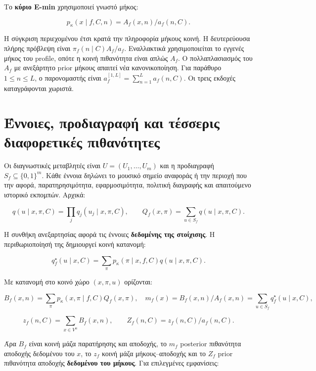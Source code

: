\documentclass[
  10pt,
  a4paper,
]{report}
\begin{document}
Το \textbf{κύριο E-min} χρησιμοποιεί γνωστό μήκος:

\[
p_\kappa(x\mid f,C,n)=A_f(x,n)/a_f(n,C).
\]

Η σύγκριση περιεχομένου έτσι κρατά την πληροφορία μήκους κοινή. Η
δευτερεύουσα πλήρης πρόβλεψη είναι \(\pi_f(n\mid C)A_f/a_f\).
Εναλλακτικά χρησιμοποιείται το εγγενές μήκος του profile, οπότε η κοινή
πιθανότητα είναι απλώς \(A_f\). Ο πολλαπλασιασμός του \(A_f\) με
ανεξάρτητο prior μήκους απαιτεί νέα κανονικοποίηση. Για παράθυρο
\(1\le n\le L\), ο παρονομαστής είναι
\(a_f^{[1,L]}=\sum_{n=1}^L a_f(n,C)\). Οι τρεις εκδοχές καταγράφονται
χωριστά.

\section{Έννοιες, προδιαγραφή και τέσσερις διαφορετικές
πιθανότητες}\label{ux3adux3bdux3bdux3bfux3b9ux3b5ux3c2-ux3c0ux3c1ux3bfux3b4ux3b9ux3b1ux3b3ux3c1ux3b1ux3c6ux3ae-ux3baux3b1ux3b9-ux3c4ux3adux3c3ux3c3ux3b5ux3c1ux3b9ux3c2-ux3b4ux3b9ux3b1ux3c6ux3bfux3c1ux3b5ux3c4ux3b9ux3baux3adux3c2-ux3c0ux3b9ux3b8ux3b1ux3bdux3ccux3c4ux3b7ux3c4ux3b5ux3c2}

Οι διαγνωστικές μεταβλητές είναι \(U=(U_1,\ldots,U_m)\) και η
προδιαγραφή \(S_f\subseteq\{0,1\}^m\). Κάθε έννοια δηλώνει το μουσικό
σημείο αναφοράς ή την περιοχή που την αφορά, παρατηρησιμότητα,
εφαρμοσιμότητα, πολιτική διαγραφής και απαιτούμενο ιστορικό εκπομπών.
Αρχικά:

\[
q(u\mid x,\pi,C)=\prod_jq_j(u_j\mid x,\pi,C),\qquad
Q_f(x,\pi)=\sum_{u\in S_f}q(u\mid x,\pi,C).
\]

Η συνθήκη ανεξαρτησίας αφορά τις έννοιες \textbf{δεδομένης της
στοίχισης}. Η περιθωριοποίησή της δημιουργεί κοινή κατανομή:

\[
q_f^\star(u\mid x,C)=\sum_\pi p_\kappa(\pi\mid x,f,C)q(u\mid x,\pi,C).
\]

Με κατανομή στο κοινό χώρο \((x,\pi,u)\) ορίζονται:

\[
B_f(x,n)=\sum_\pi p_\kappa(x,\pi\mid f,C)Q_f(x,\pi),\quad
m_f(x)=B_f(x,n)/A_f(x,n)=\sum_{u\in S_f}q_f^\star(u\mid x,C),
\]

\[
z_f(n,C)=\sum_{x\in V^n}B_f(x,n),\qquad
Z_f(n,C)=z_f(n,C)/a_f(n,C).
\]

Άρα \(B_f\) είναι κοινή μάζα παρατήρησης και αποδοχής, το \(m_f\)
posterior πιθανότητα αποδοχής δεδομένου του \(x\), το \(z_f\) κοινή μάζα
μήκους--αποδοχής και το \(Z_f\) prior πιθανότητα αποδοχής
\textbf{δεδομένου του μήκους}. Για επιλεγμένες εμφανίσεις:
\end{document}
